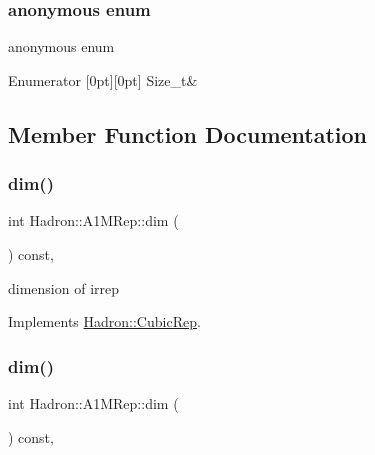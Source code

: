 \subsubsection{\texorpdfstring{anonymous enum}{anonymous enum}}
{\footnotesize\ttfamily anonymous enum}

\begin{DoxyEnumFields}{Enumerator}
[0pt][0pt]{}\mbox{\label{structHadron_1_1A1MRep_a36d7ad224fcdfef946b6a1a1e14e2ce4a8c0218fbd5c7fb561bbb665bfffbd142}} 
Size\+\_\+t&\\
\hline

\end{DoxyEnumFields}


\subsection{Member Function Documentation}
\mbox{\label{structHadron_1_1A1MRep_a149774bce9c5d4c1fcfeafac85663d04}} 
\subsubsection{\texorpdfstring{dim()}{dim()}\hspace{0.1cm}{\footnotesize\ttfamily [1/2]}}
{\footnotesize\ttfamily int Hadron\+::\+A1\+M\+Rep\+::dim (\begin{DoxyParamCaption}{ }\end{DoxyParamCaption}) const\hspace{0.3cm}{\ttfamily [inline]}, {\ttfamily [virtual]}}

dimension of irrep 

Implements \mbox{\hyperlink{structHadron_1_1CubicRep_ac178d14064f037a66af4b9fb4b312d51}{Hadron\+::\+Cubic\+Rep}}.

\mbox{\label{structHadron_1_1A1MRep_a149774bce9c5d4c1fcfeafac85663d04}} 
\subsubsection{\texorpdfstring{dim()}{dim()}\hspace{0.1cm}{\footnotesize\ttfamily [2/2]}}
{\footnotesize\ttfamily int Hadron\+::\+A1\+M\+Rep\+::dim (\begin{DoxyParamCaption}{ }\end{DoxyParamCaption}) const\hspace{0.3cm}{\ttfamily [inline]}, {\ttfamily [virtual]}}

